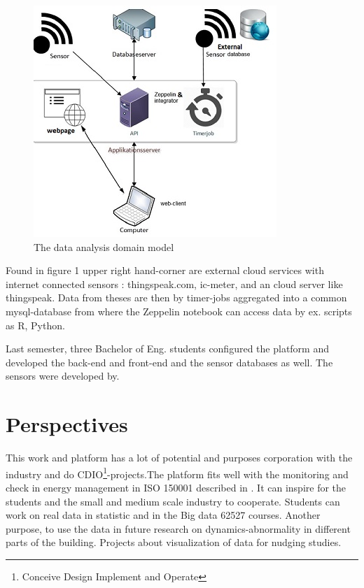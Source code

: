 \documentclass[conference]{IEEEtran}
\begin{document}
\begin{figure}[ht]


\includegraphics[scale=0.7]{datasamlings_platform2.jpg}
\centering
\caption{The data analysis domain model}
\label{fig:univerise}
\end{figure}

\par{Found in figure 1 upper right hand-corner are external cloud services with internet connected sensors : thingspeak.com, ic-meter, and an cloud server like thingspeak. Data from theses are then by timer-jobs aggregated into a common mysql-database from where the Zeppelin notebook can access data by ex. scripts as R, Python.}\par
Last semester, three Bachelor of Eng. students \cite{datasamling}  configured the platform and  developed the back-end and front-end  and the sensor databases as well. The sensors were developed by. 


\section{Perspectives}
This work and platform has a lot of potential and purposes corporation with the industry and do CDIO\footnote{Conceive Design Implement and Operate}-projects.The platform fits well with the monitoring and check in energy management in ISO 150001 described in \cite{EnergyIndustries1}. It can inspire for the students and the small and medium scale industry to cooperate. Students can work on real data in statistic and in the Big data 62527 courses. Another purpose, to use the data in future research on dynamics-abnormality in different parts of the building\cite{Oh2016}. Projects about visualization of data for nudging studies\cite{Ali2013VisualizationHomes}.

\printbibliography[title={References}]
\end{document}
